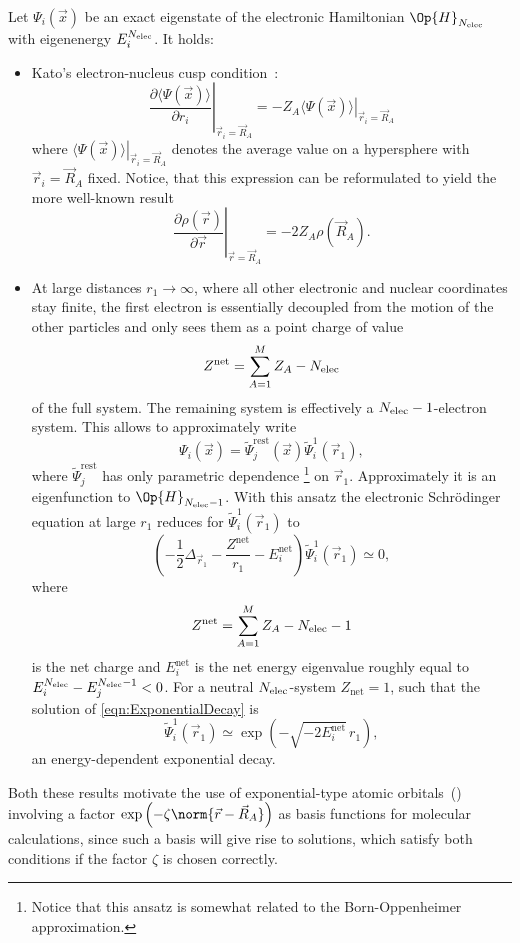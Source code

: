 \begin{rem}
	\label{rem:PhysicalProperties}
	Let $\Psi_i(\vec{x})$ be an exact eigenstate of the electronic
	Hamiltonian $\Op{H}_{\Nelec}$ with eigenenergy $E^{N_\text{elec}}_i$.
	It holds:
	\begin{itemize}
		\item Kato's electron-nucleus cusp condition~\cite{Kato1957}:
			\[
				\left. \frac{\partial \langle\Psi(\vec{x})\rangle}
				{\partial r_i} \right|_{\vec{r}_i = \vec{R}_A}
				= -Z_A \left. \langle\Psi(\vec{x})\rangle \right|_{\vec{r}_i = \vec{R}_A}
			\]
			where $\left. \langle\Psi(\vec{x})\rangle \right|_{\vec{r}_i = \vec{R}_A}$
			denotes the average value on a hypersphere with $\vec{r}_i = \vec{R}_A$ fixed.
			Notice, that this expression can be reformulated to yield
			the more well-known result
			\[
				\left. \frac{\partial \rho(\vec{r})}{\partial \vec{r}} \right|_{\vec{r} = \vec{R}_A}
				= -2 Z_A \rho(\vec{R}_A).
			\]
		\item At large distances $r_1 \to \infty$,
			where all other electronic and nuclear coordinates stay finite,
			the first electron is essentially decoupled from the motion
			of the other particles and only sees them as a point charge
			of value
			\[ Z^\text{net} = \sum_{A=1}^M Z_A - N_\text{elec}\]
			of the full system.
			The remaining system is effectively a $N_\text{elec}-1$-electron system.
			This allows to approximately write
			\[ \Psi_i(\vec{x}) = \tilde{\Psi}^\text{rest}_j(\vec{x}) \tilde{\Psi}^1_i(\vec{r}_1), \]
			where $\tilde{\Psi}^\text{rest}_j$ has only parametric dependence%
			\footnote{Notice that this ansatz is somewhat related to the Born-Oppenheimer
			approximation.}
			on $\vec{r}_1$.
			Approximately it is an eigenfunction to $\Op{H}_{\Nelec-1}$.
			With this ansatz the electronic Schrödinger equation at large $r_1$
			reduces for $\tilde{\Psi}^1_i(\vec{r}_1)$ to
			\begin{equation}
				\left( -\frac12 \Delta_{\vec{r}_1} - \frac{Z^\text{net}}{r_1} - E^\text{net}_i \right)
				\tilde{\Psi}_i^1(\vec{r}_1) \simeq 0,
				\label{eqn:ExponentialDecay}
			\end{equation}
			where
			\[ Z^\text{net} = \sum_{A=1}^M Z_A - N_\text{elec} - 1\]
			is the net charge and $E^\text{net}_i$ is the net energy eigenvalue
			roughly equal to \linebreak
			$E^{N_\text{elec}}_i - E^{N_\text{elec}-1}_j < 0$.
			For a neutral $N_\text{elec}$-system $Z_\text{net} = 1$,
			such that the solution of \eqref{eqn:ExponentialDecay} is
			\begin{equation}
				\tilde{\Psi}_i^1(\vec{r}_1) \simeq \exp\left( - \sqrt{-2E^\text{net}_i} \, r_1 \right),
				\label{eqn:EnergyDependentDecay}
			\end{equation}
			\ie an energy-dependent exponential decay.
	\end{itemize}
\end{rem}
Both these results motivate the use of exponential-type atomic orbitals~(\ETO)
involving a factor $\exp\left(-\zeta \norm{\vec{r} - \vec{R}_A} \right)$
as basis functions for molecular calculations,
since such a basis will give rise to solutions,
which satisfy both conditions if the factor $\zeta$ is chosen correctly.

